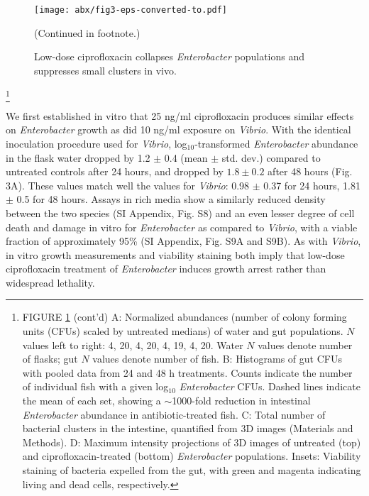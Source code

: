 \begin{figure}[h]
	\centerline{
		\texttt{[image: abx/fig3-eps-converted-to.pdf]}}
	\caption{Low-dose ciprofloxacin collapses \textit{Enterobacter} populations and suppresses small clusters in vivo.}{(Continued in footnote.)} 
	\label{fig:fig3}
\end{figure}

{\let\thefootnote\relax\footnote{FIGURE \ref{fig:fig3} (cont'd) A: Normalized abundances (number of colony forming units (CFUs) scaled by untreated medians) of water and gut populations. $N$ values left to right: 4, 20, 4, 20, 4, 19, 4, 20. Water $N$ values denote number of flasks; gut $N$ values denote number of fish. B: Histograms of gut CFUs with pooled data from 24 and 48 h treatments. Counts indicate the number of individual fish with a given log$_{10}$ \textit{Enterobacter} CFUs. Dashed lines indicate the mean of each set, showing a $\sim$1000-fold reduction in intestinal \textit{Enterobacter} abundance in antibiotic-treated fish. C: Total number of bacterial clusters in the intestine, quantified from 3D images (Materials and Methods). D: Maximum intensity projections of 3D images of untreated (top) and ciprofloxacin-treated (bottom) \textit{Enterobacter} populations. Insets: Viability staining of bacteria expelled from the gut, with green and magenta indicating living and dead cells, respectively.}}

We first established in vitro that 25 ng/ml ciprofloxacin produces similar effects on \textit{Enterobacter} growth as did 10 ng/ml exposure on \textit{Vibrio}. With the identical inoculation procedure used for \textit{Vibrio}, log$_{10}$-transformed \textit{Enterobacter} abundance in the flask water dropped by 1.2 $\pm$ 0.4 (mean $\pm$ std. dev.) compared to untreated controls after 24 hours, and dropped by $1.8 \pm 0.2$ after 48 hours (Fig. 3A). These values match well the values for \textit{Vibrio}: 0.98 $\pm$ 0.37 for 24 hours, 1.81 $\pm$ 0.5 for 48 hours. Assays in rich media show a similarly reduced density between the two species (SI Appendix, Fig. S8) and an even lesser degree of cell death and damage in vitro for  \textit{Enterobacter} as compared to \textit{Vibrio}, with a viable fraction of approximately 95\% (SI Appendix, Fig. S9A and S9B). As with \textit{Vibrio}, in vitro growth measurements and viability staining both imply that low-dose ciprofloxacin treatment of \textit{Enterobacter} induces growth arrest rather than widespread lethality.

